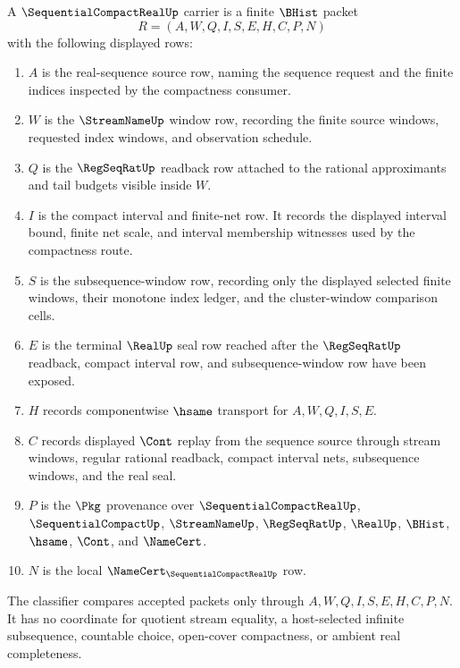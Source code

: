 \begin{definition}
\label{def:sequential-compact-real-carrier}
A $\SequentialCompactRealUp$ carrier is a finite $\BHist$ packet
$$
R=(A,W,Q,I,S,E,H,C,P,N)
$$
with the following displayed rows:
\begin{enumerate}
\item $A$ is the real-sequence source row, naming the sequence request and the finite indices inspected by the compactness consumer.
\item $W$ is the $\StreamNameUp$ window row, recording the finite source windows, requested index windows, and observation schedule.
\item $Q$ is the $\RegSeqRatUp$ readback row attached to the rational approximants and tail budgets visible inside $W$.
\item $I$ is the compact interval and finite-net row. It records the displayed interval bound, finite net scale, and interval membership witnesses used by the compactness route.
\item $S$ is the subsequence-window row, recording only the displayed selected finite windows, their monotone index ledger, and the cluster-window comparison cells.
\item $E$ is the terminal $\RealUp$ seal row reached after the $\RegSeqRatUp$ readback, compact interval row, and subsequence-window row have been exposed.
\item $H$ records componentwise $\hsame$ transport for $A,W,Q,I,S,E$.
\item $C$ records displayed $\Cont$ replay from the sequence source through stream windows, regular rational readback, compact interval nets, subsequence windows, and the real seal.
\item $P$ is the $\Pkg$ provenance over $\SequentialCompactRealUp$, $\SequentialCompactUp$, $\StreamNameUp$, $\RegSeqRatUp$, $\RealUp$, $\BHist$, $\hsame$, $\Cont$, and $\NameCert$.
\item $N$ is the local $\NameCert_{\SequentialCompactRealUp}$ row.
\end{enumerate}
The classifier compares accepted packets only through $A,W,Q,I,S,E,H,C,P,N$. It has no coordinate for quotient stream equality, a host-selected infinite subsequence, countable choice, open-cover compactness, or ambient real completeness.
\end{definition}

